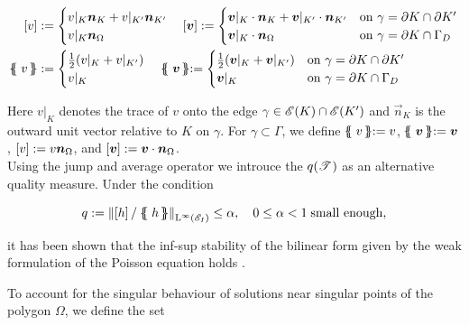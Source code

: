 \documentclass[a4paper,11pt]{article}
\begin{document}
{\begin{align}
    \jump{v} &:=
    \begin{cases}
        v |_{K} \vec{n}_{K} + v |_{K'} \vec{n}_{K'} \\
        v |_{K} \vec{n}_{\Omega} 
    \end{cases} 
    \jump{\vec{v}} :=
    \begin{cases}
        \vec{v} |_{K} \cdot \vec{n}_{K} + \vec{v} |_{K'} \cdot \vec{n}_{K'} &  \text{on } \gamma = \partial K \cap  \partial K'\\
        \vec{v} |_{K} \cdot \vec{n}_{\Omega} &  \text{on } \gamma = \partial K \cap  \Gamma_{D} 
    \end{cases}
    \\
    \avg{v} &:=
    \begin{cases}
        \frac{1}{2} ( v |_{K} + v |_{K'}) \\
        v |_{K}  
    \end{cases} 
    \avg{\vec{v}} :=
    \begin{cases}
        \frac{1}{2}(\vec{v} |_{K} + \vec{v} |_{K'}) &  \text{on } \gamma = \partial K \cap  \partial K'\\
        \vec{v} |_{K} &  \text{on } \gamma = \partial K \cap  \Gamma_{D} 
    \end{cases}
\end{align}

Here $v|_{K}$ denotes the trace of $v$ onto the edge $\gamma \in \mathscr E(K) \cap \mathscr E(K')$ and $\vec{n}_{K}$ is the outward unit vector relative to $K$ on $\gamma$. For $\gamma \subset \Gamma$, we define $\avg{v} := v$, $\avg{\vec{v}} := \vec{v}$, $\left[ v\right]:= v\boldsymbol n_{\Omega}  $, and $\left[ \boldsymbol v\right]:= \boldsymbol v \cdot \boldsymbol n_{\Omega}$.\\

Using the jump and average operator we introuce the   $q(\mathscr T^{})$ as an alternative quality measure. Under the condition 

\begin{equation}
q := \Norm{\jump{h}/\avg{h}}_{\leb{\infty}(\cE_{I})} \leq \alpha, \quad 0 \leq \alpha < 1 \; \text{small enough},
\end{equation}

it has been shown that the inf-sup stability of the bilinear form given by the weak formulation of the Poisson equation holds \cite{GMP:2017}. 

To account for the singular behaviour of solutions near singular points of the polygon $\Omega$, we define the set

}
\end{document}
